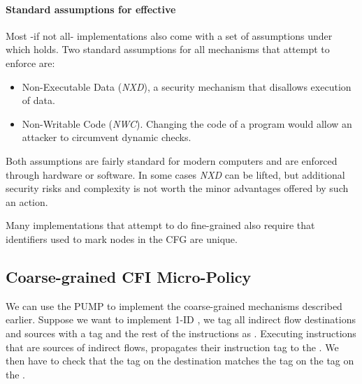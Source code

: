 
\paragraph{Standard assumptions for effective \CFI}\label{sec:cfi_assumptions}

Most -if not all- \CFI implementations also come with a set of assumptions under
which \CFI holds. Two standard assumptions for all mechanisms that attempt to
enforce \CFI are:
\begin{itemize}
\item Non-Executable Data (\emph{NXD}), a security
mechanism that disallows execution of data.
\item Non-Writable Code (\emph{NWC}). Changing the code of a
program would allow an attacker to circumvent dynamic checks.
\end{itemize}

Both assumptions are fairly standard for modern computers and are enforced
through hardware or software. In some cases \emph{NXD} can be lifted, but
additional security risks and complexity is not worth the minor advantages
offered by such an action.

Many implementations that attempt to do fine-grained \CFI also require that
identifiers used to mark nodes in the CFG are unique.

\subsection{Coarse-grained CFI Micro-Policy}\label{sec:cfi_coarse}



We can use the PUMP to implement the coarse-grained \CFI mechanisms described
earlier. Suppose we want to implement 1-ID \CFI, we tag all indirect flow
destinations and sources with a tag \MARK{} and the rest of the instructions as
\UNMARK. Executing instructions that are sources of indirect flows, propagates
their instruction tag to the \pc. We then have to check that the tag on the
destination matches the tag on the tag on the \pc.

